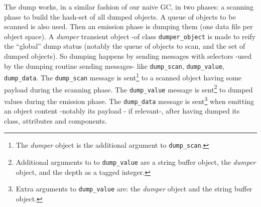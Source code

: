 The dump works, in a similar fashion of our naive GC, in two phases: a
scanning phase to build the hash-set of all dumped objects. A queue of
objects to be scanned is also used. Then an emission phase is dumping
them (one data file per object space). A \emph{dumper} transient
object -of class \texttt{dumper\_object}  is made to reify the ``global'' dump
status (notably the queue of objects to scan, and the set of dumped
objects). So dumping happens by sending messages with selectors -used
by the dumping routine sending messages- like \texttt{dump\_scan},
\texttt{dump\_value}, \texttt{dump\_data}.  The \texttt{dump\_scan}
 message is sent\footnote{The
  \emph{dumper} object is the additional argument to
  \texttt{dump\_scan}.} to a scanned object having some payload during
the scanning phase. The \texttt{dump\_value}  message is sent\footnote{Additional
  arguments to to \texttt{dump\_value} are a string buffer object, the
  \emph{dumper} object, and the depth as a tagged integer.} to dumped
values during the emission phase.  The \texttt{dump\_data}  message is sent\footnote{Extra arguments
  to \texttt{dump\_value} are: the \emph{dumper} object and the string
  buffer object.} when emitting an object content -notably its payload -
 if relevant-, after having dumped its class,
attributes and components.



